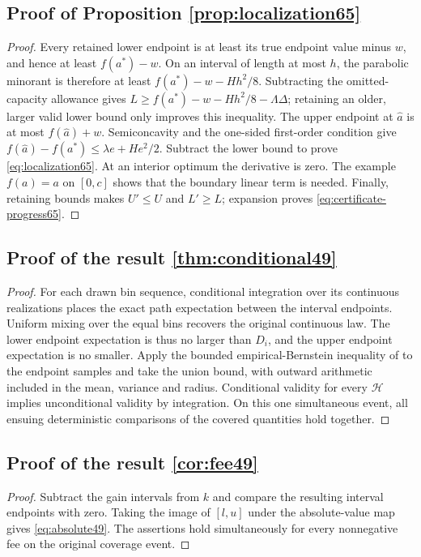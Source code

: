 \subsection{Proof of Proposition \ref{prop:localization65}}\label{supp:proof-localization65-1}
\begin{proof}
Every retained lower endpoint is at least its true endpoint value minus $w$, and hence at least $f(a^*)-w$. On an interval of length at most $h$, the parabolic minorant is therefore at least $f(a^*)-w-Hh^2/8$. Subtracting the omitted-capacity allowance gives
$L\ge f(a^*)-w-Hh^2/8-\Lambda\Delta$; retaining an older, larger valid lower bound only improves this inequality. The upper endpoint at $\widehat a$ is at most $f(\widehat a)+w$. Semiconcavity and the one-sided first-order condition give
$f(\widehat a)-f(a^*)\le\lambda e+He^2/2$. Subtract the lower bound to prove \eqref{eq:localization65}. At an interior optimum the derivative is zero. The example $f(a)=a$ on $[0,c]$ shows that the boundary linear term is needed. Finally, retaining bounds makes $U'\le U$ and $L'\ge L$; expansion proves \eqref{eq:certificate-progress65}.
\end{proof}

\subsection{Proof of the result \ref{thm:conditional49}}\label{supp:proof-decisions49-1}
\begin{proof}
For each drawn bin sequence, conditional integration over its continuous realizations places the exact path expectation between the interval endpoints. Uniform mixing over the equal bins recovers the original continuous law. The lower endpoint expectation is thus no larger than $D_i$, and the upper endpoint expectation is no smaller. Apply the bounded empirical-Bernstein inequality of \citet{maurer2009} to the endpoint samples and take the union bound, with outward arithmetic included in the mean, variance and radius. Conditional validity for every $\mathcal H$ implies unconditional validity by integration. On this one simultaneous event, all ensuing deterministic comparisons of the covered quantities hold together.
\end{proof}

\subsection{Proof of the result \ref{cor:fee49}}\label{supp:proof-decisions49-2}
\begin{proof}
Subtract the gain intervals from $k$ and compare the resulting interval endpoints with zero. Taking the image of $[l,u]$ under the absolute-value map gives \eqref{eq:absolute49}. The assertions hold simultaneously for every nonnegative fee on the original coverage event.
\end{proof}


